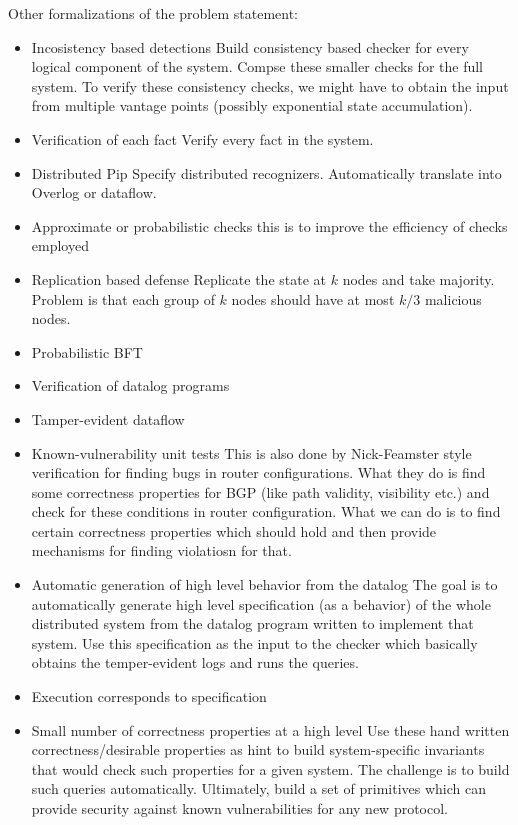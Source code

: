 Other formalizations of the problem statement: 
\begin{itemize} 
\item{Incosistency based  detections} Build consistency based checker for every logical component of the system. Compse these smaller checks for the full system. To verify these consistency checks, we might have to obtain the input from multiple vantage points (possibly exponential state accumulation). 
\item{Verification of each fact} Verify every fact in the system. 
\item{Distributed Pip} Specify distributed recognizers. Automatically translate into Overlog or dataflow.  
\item{Approximate or probabilistic checks} this is to improve the efficiency of checks employed 
\item{Replication based defense} Replicate the state at $k$ nodes and take majority. Problem is that each group of $k$ nodes should have at most $k/3$ malicious nodes.  
\item{Probabilistic BFT}  
\item{Verification of datalog programs}  
\item{Tamper-evident dataflow} 
\item{Known-vulnerability unit tests} This is also done by Nick-Feamster style verification for finding bugs in router configurations. What they do is find some correctness properties for BGP (like path validity, visibility etc.) and check for these conditions in router configuration. What we can do is to find certain correctness properties which should hold and then provide mechanisms for finding violatiosn for that.   
\item{Automatic generation of high level behavior from the datalog} The goal is to automatically generate high level specification (as a behavior) of the whole distributed system from the datalog program written to implement that system. Use this specification as the input to the checker which basically obtains the temper-evident logs and runs the queries. 
 
\item{Execution corresponds to specification}  
 
\item{Small number of correctness properties at a high level} Use these hand written correctness/desirable properties as hint to build system-specific invariants that would check such properties for a given system. The challenge is to build such queries automatically. Ultimately, build a set of primitives which can provide security against known vulnerabilities for any new protocol. 
 
\end{itemize} 
 
